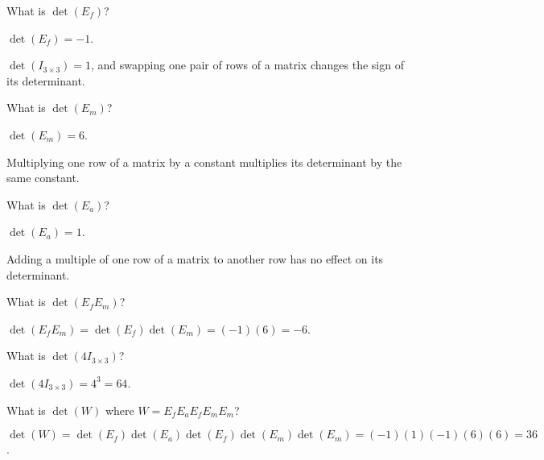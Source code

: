 	\begin{parts}
		\item What is $\det(E_f)$?
			\begin{solution}
				$\det(E_f)=-1$.

				$\det(I_{3\times 3})=1$, and swapping one pair of rows of a matrix
				changes the sign of its determinant.
			\end{solution}
		\item What is $\det(E_m)$?
			\begin{solution}
				$\det(E_m)=6$.

				Multiplying one row of a matrix by a constant multiplies its
				determinant by the same constant.
			\end{solution}
		\item What is $\det(E_a)$?
			\begin{solution}
				$\det(E_a)=1$.

				Adding a multiple of one row of a matrix to another row has no
				effect on its determinant.
			\end{solution}
		\item What is $\det(E_fE_m)$?
			\begin{solution}[inline]
				$\det(E_fE_m)=\det(E_f)\det(E_m)=(-1)(6)=-6$.
			\end{solution}
		\item What is $\det(4I_{3\times 3})$?
			\begin{solution}[inline]
				$\det(4I_{3\times 3})=4^3=64$.
			\end{solution}
		\item What is $\det(W)$ where $W=E_fE_aE_fE_mE_m$?
			\begin{solution}
				$\det(W)=\det(E_f)\det(E_a)\det(E_f)\det(E_m)\det(E_m)=(-1)(1)(-1)(6)(6)=36$.
			\end{solution}
	\end{parts}

